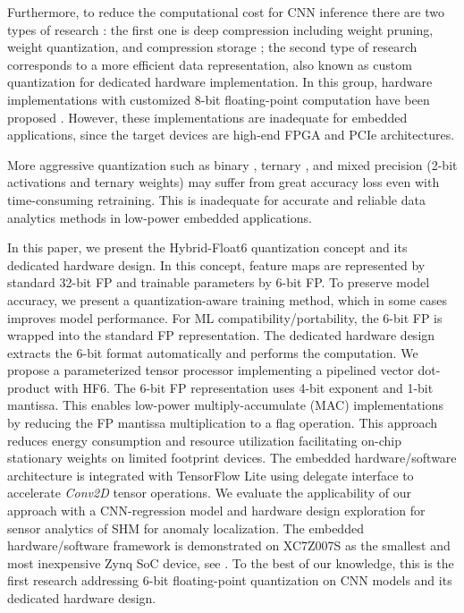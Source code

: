 Furthermore, to reduce the computational cost for CNN inference there are two types of research \cite{wu2021low}: the first one is deep compression including weight pruning, weight quantization, and compression storage \cite{han2015deep,han2015learning}; the second type of research corresponds to a more efficient data representation, also known as custom quantization for dedicated hardware implementation. In this group, hardware implementations with customized 8-bit floating-point computation have been proposed \cite{mei2017200mhz, wu2021low, lian2019high}. However, these implementations are inadequate for embedded applications, since the target devices are high-end FPGA and PCIe architectures.

More aggressive quantization such as binary \cite{courbariaux2015binaryconnect}, ternary \cite{lin2015neural}, and mixed precision (2-bit activations and ternary weights) \cite{colangelo2018exploration} may suffer from great accuracy loss even with time-consuming retraining. This is inadequate for accurate and reliable data analytics methods in low-power embedded applications.

In this paper, we present the Hybrid-Float6 quantization concept and its dedicated hardware design. In this concept, feature maps are represented by standard 32-bit FP and trainable parameters by 6-bit FP. To preserve model accuracy, we present a quantization-aware training method, which in some cases improves model performance. For ML compatibility/portability, the 6-bit FP is wrapped into the standard FP representation. The dedicated hardware design extracts the 6-bit format automatically and performs the computation. We propose a parameterized tensor processor implementing a pipelined vector dot-product with HF6. The 6-bit FP representation uses 4-bit exponent and 1-bit mantissa. This enables low-power multiply-accumulate (MAC) implementations by reducing the FP mantissa multiplication to a flag operation. This approach reduces energy consumption and resource utilization facilitating on-chip stationary weights on limited footprint devices. The embedded hardware/software architecture is integrated with TensorFlow Lite using delegate interface to accelerate \emph{Conv2D} tensor operations. We evaluate the applicability of our approach with a CNN-regression model and hardware design exploration for sensor analytics of SHM for anomaly localization. The embedded hardware/software framework is demonstrated on XC7Z007S as the smallest and most inexpensive Zynq SoC device, see . To the best of our knowledge, this is the first research addressing 6-bit floating-point quantization on CNN models and its dedicated hardware design.

